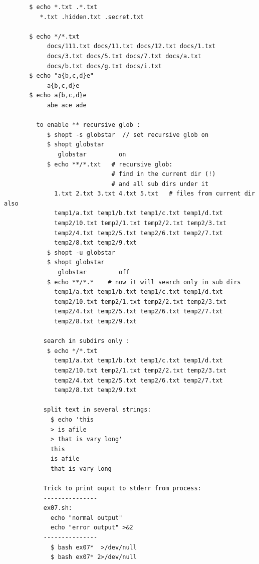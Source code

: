 \documentclass[a4paper,12pt]{article}
\begin{document}
\begin{verbatim}
       $ echo *.txt .*.txt
          *.txt .hidden.txt .secret.txt       
       
       $ echo */*.txt
            docs/111.txt docs/11.txt docs/12.txt docs/1.txt
            docs/3.txt docs/5.txt docs/7.txt docs/a.txt
            docs/b.txt docs/g.txt docs/i.txt
       $ echo "a{b,c,d}e"
            a{b,c,d}e
       $ echo a{b,c,d}e
            abe ace ade     

         to enable ** recursive glob :
            $ shopt -s globstar  // set recursive glob on
            $ shopt globstar
               globstar       	on
            $ echo **/*.txt   # recursive glob: 
                              # find in the current dir (!)
                              # and all sub dirs under it 
              1.txt 2.txt 3.txt 4.txt 5.txt   # files from current dir also
              temp1/a.txt temp1/b.txt temp1/c.txt temp1/d.txt
              temp2/10.txt temp2/1.txt temp2/2.txt temp2/3.txt
              temp2/4.txt temp2/5.txt temp2/6.txt temp2/7.txt
              temp2/8.txt temp2/9.txt
            $ shopt -u globstar
            $ shopt globstar
               globstar       	off
            $ echo **/*.*    # now it will search only in sub dirs
              temp1/a.txt temp1/b.txt temp1/c.txt temp1/d.txt 
              temp2/10.txt temp2/1.txt temp2/2.txt temp2/3.txt 
              temp2/4.txt temp2/5.txt temp2/6.txt temp2/7.txt 
              temp2/8.txt temp2/9.txt
       
           search in subdirs only : 
           	$ echo */*.txt
              temp1/a.txt temp1/b.txt temp1/c.txt temp1/d.txt 
              temp2/10.txt temp2/1.txt temp2/2.txt temp2/3.txt 
              temp2/4.txt temp2/5.txt temp2/6.txt temp2/7.txt 
              temp2/8.txt temp2/9.txt  
           
           split text in several strings:   
             $ echo 'this
             > is afile
             > that is vary long'
             this
             is afile
             that is vary long

           Trick to print ouput to stderr from process:
           ---------------
           ex07.sh:
             echo "normal output"
             echo "error output" >&2            
           --------------- 
             $ bash ex07*  >/dev/null
             $ bash ex07* 2>/dev/null 
               
                      
\end{verbatim}
\end{document}
